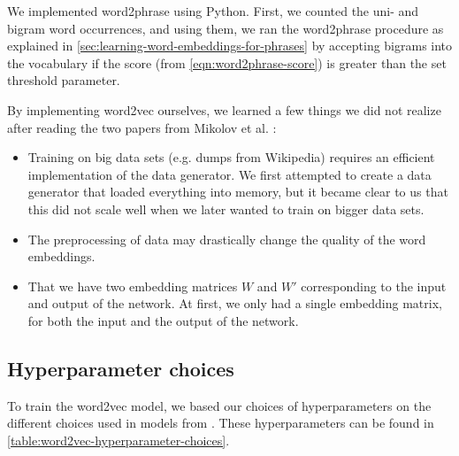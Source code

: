 We implemented word2phrase using Python. First, we counted the uni- and bigram word occurrences, and using them, we ran the word2phrase procedure as explained in \cref{sec:learning-word-embeddings-for-phrases} by accepting bigrams into the vocabulary if the score (from \cref{eqn:word2phrase-score}) is greater than the set threshold parameter.

By implementing word2vec ourselves, we learned a few things we did not realize after reading the two papers from Mikolov et al. \cite{mikolov2013a, mikolov2013b}:
\begin{itemize}
    \item Training on big data sets (e.g. dumps from Wikipedia) requires an efficient implementation of the data generator. We first attempted to create a data generator that loaded everything into memory, but it became clear to us that this did not scale well when we later wanted to train on bigger data sets.
    \item The preprocessing of data may drastically change the quality of the word embeddings.
    \item That we have two embedding matrices $W$ and $W'$ corresponding to the input and output of the network. At first, we only had a single embedding matrix, for both the input and the output of the network.
\end{itemize}

\subsection{Hyperparameter choices}
\label{sec:word2vec-hyperparameter-choices}
To train the word2vec model, we based our choices of hyperparameters on the different choices used in models from \cite{mikolov2013a, mikolov2013b}. These hyperparameters can be found in \cref{table:word2vec-hyperparameter-choices}.

